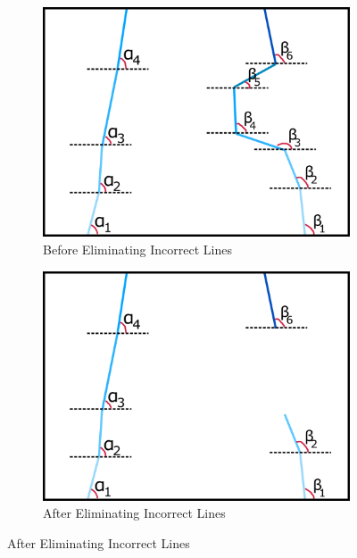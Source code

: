 \documentclass[a4paper,12pt]{article}
\begin{document}
\begin{enumerate}
\begin{figure}[b!]
\begin{subfigure}{.46\textwidth}

\centering

\includegraphics[width=0.44\unitlength]{images/dataP_explained1}

\caption{\label{fig:dataP_explained1} Before Eliminating Incorrect Lines}

\end{subfigure}%
\begin{subfigure}{.46\textwidth}

\centering

\includegraphics[width=0.44\unitlength]{images/dataP_explained2}

\caption{\label{fig:dataP_explained2} After Eliminating Incorrect Lines}


\end{subfigure}
\end{figure}
\end{enumerate}
\end{document}
